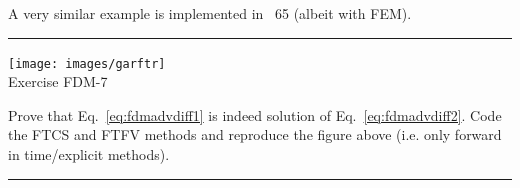A very similar example is implemented in \stone~65 (albeit with FEM).

\begin{center}
\begin{minipage}[t]{0.77\textwidth}
\par\noindent\rule{\textwidth}{0.4pt}

\begin{center}
\texttt{[image: images/garftr]} \\
{\color{orange}Exercise FDM-7}
\end{center}

Prove that Eq.~\eqref{eq:fdmadvdiff1} is indeed solution of 
Eq.~\eqref{eq:fdmadvdiff2}. Code the FTCS and FTFV methods and reproduce 
the figure above (i.e. only forward in time/explicit methods).

\par\noindent\rule{\textwidth}{0.4pt}
\end{minipage}
\end{center}

